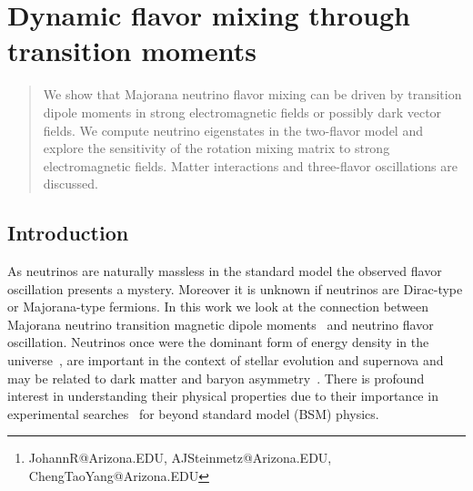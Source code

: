 \documentclass[addchapnum]{ws-rv961x669} %
\begin{document}
\chapter[Dynamic flavor mixing through transition moments]{Dynamic flavor mixing through transition moments\label{JR_ch1}}

\author[J. Rafelski, A. Steinmetz, and C. T. Yang]{Johann Rafelski, Andrew Steinmetz, and Cheng Tao Yang\footnote{JohannR@Arizona.EDU, AJSteinmetz@Arizona.EDU, ChengTaoYang@Arizona.EDU}}

\address{Department of Physics, The University of Arizona, Tucson, AZ 85721, USA}

\begin{abstract} 
We show that Majorana neutrino flavor mixing can be driven by transition dipole moments in strong electromagnetic fields or possibly dark vector fields. We compute neutrino eigenstates in the two-flavor model and explore the sensitivity of the rotation mixing matrix to strong electromagnetic fields. Matter interactions and three-flavor oscillations are discussed.
\end{abstract}


\body


\section{Introduction}
\label{sec:intro}

As neutrinos are naturally massless in the standard model the observed flavor oscillation presents a mystery. Moreover it is unknown if neutrinos are Dirac-type or Majorana-type fermions. In this work we look at the connection between Majorana neutrino transition magnetic dipole moments~\cite{Fujikawa:1980yx,Shrock:1980vy,Shrock:1982sc} and neutrino flavor oscillation. Neutrinos once were the dominant form of energy density in the universe~\cite{Rafelski:2023emw}, are important in the context of stellar evolution and supernova and may be related to dark matter and baryon asymmetry~\cite{Asaka:2005pn,Boyarsky:2009ix}. There is profound interest in understanding their physical properties due to their importance in experimental searches~\cite{DUNE:2020fgq} for beyond standard model (BSM) physics.
\end{document}
